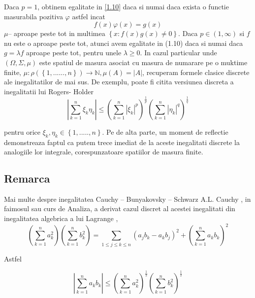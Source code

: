 \documentclass[a4paper,12pt,oneside]{report}
\begin{document}
Daca \(p = 1\), obtinem egalitate in \ref{1.10} daca si numai daca exista o functie masurabila pozitiva \(\varphi\) astfel incat 
\begin{displaymath}
  f\left ( x \right )\varphi \left ( x \right ) = g\left ( x \right )
\end{displaymath}
\(\mu –\) aproape peste tot in multimea \(\left \{ x : f\left ( x \right )g\left ( x \right )\neq 0 \right \}\). 
	Daca \(p \in \left ( 1 , \infty  \right )\) si \(f\) nu este o aproape peste tot, atunci avem egalitate in (1.10) daca si numai daca  \(g = \lambda f\) aproape peste tot, pentru unele \(\lambda \geq 0\). 
	In  cazul particular unde \(\left ( \Omega , \Sigma, \mu \right )\) este spatiul de masura asociat cu masura de numarare pe o muktime finite, \(\mu  : \rho \left ( \left \{ 1,......, n \right \} \right )\rightarrow \mathbb{N}, \mu \left ( A \right ) = \left | A \right |\), 
recuperam formele clasice discrete ale inegalitatilor de mai sus. De exemplu, poate fi citita versiunea discreta a inegalitatii lui Rogers- Holder
\begin{displaymath}
  \left | \sum_{k=1}^{n} \xi _{k}\eta _{k}\right |\leq \left ( \sum_{k = 1}^{n}\left | \xi _{k}\right |^{p}  \right )^{\frac{1}{p}}\left ( \sum_{k = 1}^{n} \left | \eta _{k} \right |^{q}\right )^{\frac{1}{q}}
\end{displaymath}

pentru  orice \(\xi _{k}, \eta _{k} \in \left \{ 1,.....,n \right \}.\) Pe de alta parte, un moment de reflectie demonstreaza faptul ca putem trece imediat de la aceste inegalitati discrete la analogiile lor integrale, corespunzatoare spatiilor de masura finite. 

\subsection{Remarca}

Mai multe despre inegalitatea Cauchy – Bunyakovsky – Schwarz
A.L. Cauchy , in faimosul sau curs de Analiza, a derivat cazul discret al acestei inegalitati din inegalitatea algebrica a  lui Lagrange ,
\begin{displaymath}
  \left ( \sum_{k = 1}^{n} a_{k}^{2}\right )\left ( \sum_{k = 1}^{n} b_{k}^{2}\right ) =  \sum_{1\leq j\leq k\leq n}\left ( a_{j}b_{k} - a_{k}b_{j} \right )^{2} + \left ( \sum_{k = 1}^{n} a_{k}b_{k}\right )^{2}
\end{displaymath}

Astfel 

\begin{displaymath}
  \left | \sum_{k = 1}^{n} a_{k}b_{k} \right |\leq \left ( \sum_{k = 1}^{n}a_{k}^{2} \right )^{\frac{1}{2}}\left ( \sum_{k = 1}^{n}b_{k}^{2} \right )^{\frac{1}{2}}
\end{displaymath}
\end{document}
